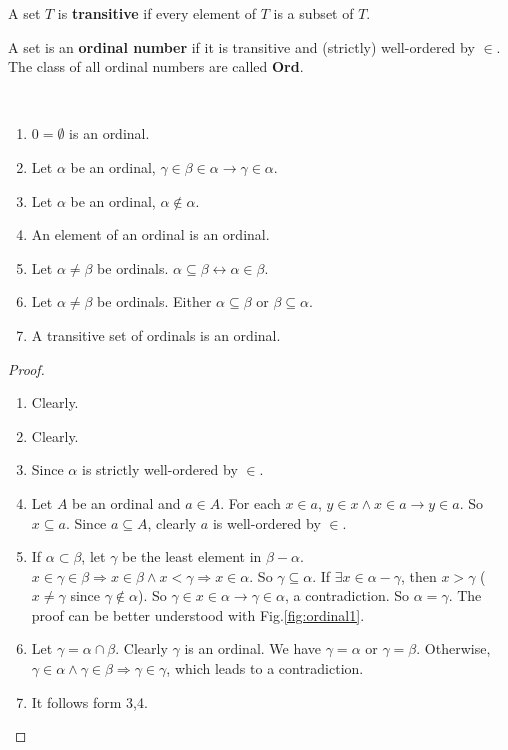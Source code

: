 \documentclass[12pt]{book}
\begin{document}
\begin{definition}
	A set $T$ is {\bf transitive} if every element of $T$ is a subset of $T$.
\end{definition}

\begin{definition}
	A set is an {\bf ordinal number} if it is transitive and (strictly) well-ordered by $\in$. The class of all ordinal numbers are called {\bf Ord}.
\end{definition}

\begin{lemma}
	\
	\begin{enumerate}
		\item $0=\emptyset$ is an ordinal.
		\item Let $\alpha$ be an ordinal, $\gamma\in\beta\in\alpha\rightarrow\gamma\in\alpha$.
		\item Let $\alpha$ be an ordinal, $\alpha\not\in\alpha$.
		\item An element of an ordinal is an ordinal.
		\item Let $\alpha\neq \beta$ be ordinals. $\alpha\subseteq \beta\leftrightarrow\alpha\in\beta$.
		\item Let $\alpha\neq \beta$ be ordinals. Either $\alpha\subseteq\beta$ or $\beta\subseteq \alpha$.
		\item A transitive set of ordinals is an ordinal.
	\end{enumerate}
\end{lemma}
\begin{proof}
	\
	\begin{enumerate}
		\item Clearly.
		\item Clearly.
		\item Since $\alpha$ is strictly well-ordered by $\in$.
		\item Let $A$ be an ordinal and $a\in A$. For each $x\in a$, $y\in x\wedge x\in a\rightarrow y\in a$. So $x\subseteq a$. Since $a\subseteq A$, clearly $a$ is well-ordered by $\in$.
		\item If $\alpha\subset \beta$, let $\gamma$ be the least element in $\beta-\alpha$. $x\in\gamma\in\beta\Rightarrow x\in\beta\wedge x<\gamma\Rightarrow x\in \alpha$. So $\gamma\subseteq\alpha$. If $\exists x\in\alpha-\gamma$, then $x>\gamma$ ($x\neq\gamma$ since $\gamma\not\in\alpha$). So $\gamma\in x\in\alpha\rightarrow \gamma\in\alpha$, a contradiction. So $\alpha=\gamma$. The proof can be better understood with Fig.\ref{fig:ordinal1}.
		\item Let $\gamma=\alpha\cap \beta$. Clearly $\gamma$ is an ordinal. We have $\gamma=\alpha$ or $\gamma=\beta$. Otherwise, $\gamma\in\alpha\wedge\gamma\in\beta\Rightarrow\gamma\in\gamma$, which leads to a contradiction.
		\item It follows form 3,4.
	\end{enumerate}
\end{proof}
\end{document}
